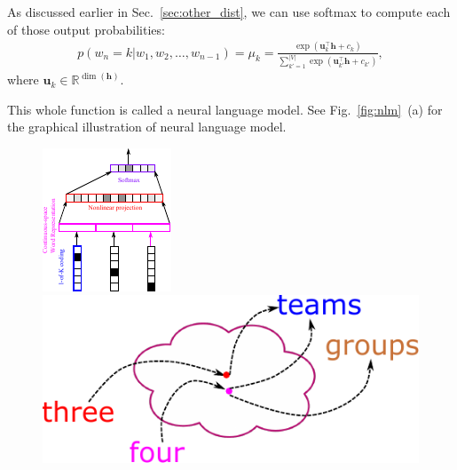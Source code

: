 \documentclass{report}
\newcommand{\vect}[1]{\mathbf{#1}}
\newcommand{\vh}[0]{\vect{h}}
\newcommand{\vu}[0]{\vect{u}}
\newcommand{\RR}[0]{\mathbb{R}}
\begin{document}
As discussed earlier in Sec.~\ref{sec:other_dist}, we can use softmax to compute
each of those output probabilities:
\begin{align}
    \label{eq:nlm_softmax}
    p(w_n = k | w_1, w_2, \ldots, w_{n-1}) = \mu_k = \frac{\exp(\vu_k^\top \vh +
    c_k)}{\sum_{k'=1}^{|V|} \exp(\vu_{k'}^\top \vh + c_{k'})},
\end{align}
where $\vu_k \in \RR^{\dim(\vh)}$. 

This whole function is called a neural language model.  See
Fig.~\ref{fig:nlm}~(a)
for the graphical illustration of neural language model.

\begin{figure}[t]
    \centering
    \begin{minipage}[!b]{0.49\textwidth}
        \centering
        \includegraphics[width=0.9\columnwidth]{figures/nlm.pdf}
    \end{minipage}
    \begin{minipage}[!b]{0.49\textwidth}
        \centering
        \includegraphics[width=0.9\columnwidth]{figures/cslm.pdf}

\end{minipage}
\end{figure}
\end{document}
